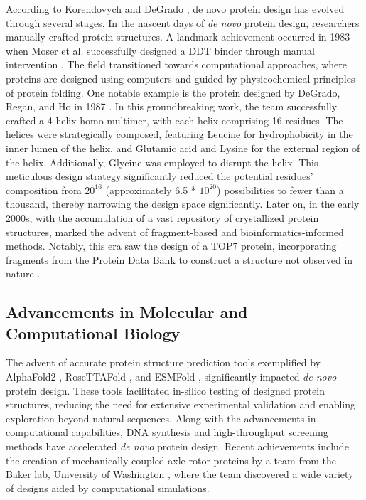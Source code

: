 \documentclass[11pt,a4paper]{article}
\begin{document}
According to Korendovych and DeGrado \cite{korendovych2020novo}, de 
novo protein design has evolved through several stages.
In the nascent days of \emph{de novo} protein design, researchers manually 
crafted protein structures. A landmark achievement occurred in 1983 
when Moser et al. successfully designed a DDT binder through manual 
intervention \cite{moser1983artificial}.
The field transitioned towards computational approaches, where proteins 
are designed using computers and guided by physicochemical principles 
of protein folding. One notable example is the protein designed by 
DeGrado, Regan, and Ho in 1987 \cite{degrado1987design}. In this 
groundbreaking work, the team successfully crafted a 4-helix 
homo-multimer, with each helix comprising 16 residues. The helices were 
strategically composed, featuring Leucine for hydrophobicity in the 
inner lumen of the helix, and Glutamic acid and Lysine for the external 
region of the helix. Additionally, Glycine was employed to disrupt the 
helix. This meticulous design strategy significantly reduced the 
potential residues' composition from $20^{16}$ (approximately 6.5 * $10^
{20}$) possibilities to fewer than a thousand, thereby narrowing the 
design space significantly. 
Later on, in the early 2000s, with the accumulation of a vast repository 
of crystallized protein structures,  marked the advent of 
fragment-based and bioinformatics-informed methods. Notably, this era 
saw the design of a  TOP7 protein, incorporating fragments from the 
Protein Data Bank to construct a structure not observed in nature \cite
{kuhlman2003design}.

\subsection{Advancements in Molecular and Computational Biology}

The advent of accurate protein structure prediction tools exemplified 
by AlphaFold2 \cite{jumper2021highly}, RoseTTAFold \cite
{baek2021accurate}, and ESMFold \cite{lin2022language}, significantly 
impacted \emph{de novo} protein design. These tools facilitated in-silico 
testing of designed protein structures, reducing the need for extensive 
experimental validation and enabling exploration beyond natural 
sequences.
Along with the advancements in computational capabilities, DNA synthesis 
and high-throughput screening methods have accelerated \emph{de novo} protein 
design. Recent achievements include the creation of mechanically 
coupled  axle-rotor proteins by a team from the Baker lab, University 
of Washington \cite{courbet2022computational}, where the team 
discovered a wide variety of designs aided by computational simulations.
\end{document}

